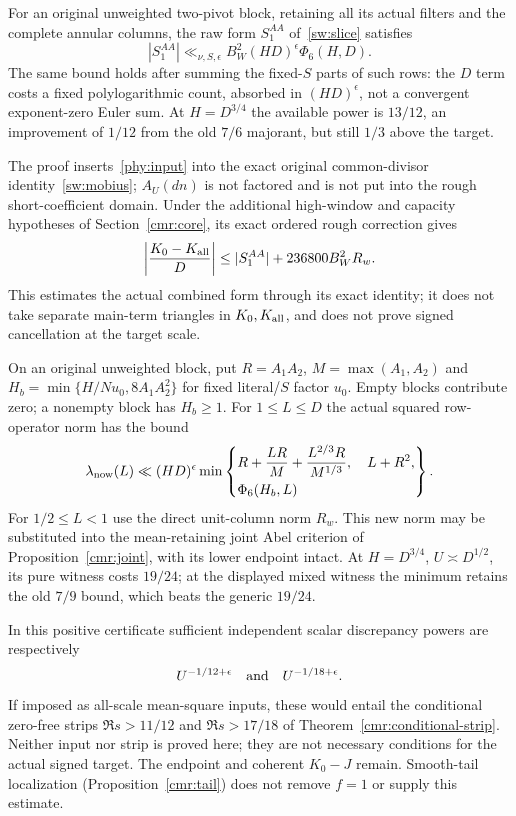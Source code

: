 \begin{proposition}[The actual $A_6=1$ signed slice]\label{phy:signed}
For an original unweighted two-pivot block, retaining all its actual
filters and the complete annular columns, the raw form
$S_1^{AA}$ of~\eqref{sw:slice} satisfies
\[
 |S_1^{AA}|\ll_{\nu,S,\epsilon}
       B_W^2(HD)^\epsilon\Phi_6(H,D).
\]
The same bound holds after summing the fixed-$S$ parts of such rows:
the $D$ term costs a fixed polylogarithmic count, absorbed in
$(HD)^\epsilon$, not a convergent exponent-zero Euler sum.
At $H=D^{3/4}$ the available power is $13/12$, an improvement of $1/12$
from the old $7/6$ majorant, but still $1/3$ above the target.
\end{proposition}
The proof inserts~\eqref{phy:input} into the exact original
common-divisor identity~\eqref{sw:mobius}; $A_U(dn)$ is not factored
and is not put into the rough short-coefficient domain.
Under the additional high-window and capacity hypotheses of
Section~\ref{cmr:core}, its exact ordered rough correction gives
\begin{equation}\label{phy:combined}
 \left|\frac{K_0-K_{\rm all}}D\right|
 \le |S_1^{AA}|+236800B_W^2R_w.
\end{equation}
This estimates the actual combined form through its exact identity;
it does not take separate main-term triangles in $K_0,K_{\rm all}$,
and does not prove signed cancellation at the target scale.

\begin{proposition}\label{phy:short}
On an original unweighted block, put $R=A_1A_2$,
$M=\max(A_1,A_2)$ and
$H_b=\min\{H/Nu_0,8A_1A_2^2\}$ for fixed literal/$S$ factor $u_0$.
Empty blocks contribute zero; a nonempty block has $H_b\ge1$.
For $1\le L\le D$ the actual squared row-operator norm has the bound
\[
 \lambda_{\rm now}(L)\ll(HD)^\epsilon
 \min\left\{\begin{aligned}
 &R+\frac{LR}{M}+\frac{L^{2/3}R}{M^{1/3}},\quad L+R^2,\\
 &\Phi_6(H_b,L)
 \end{aligned}\right\}.
\]
For $1/2\le L<1$ use the direct unit-column norm $R_w$.
This new norm may be substituted into the mean-retaining joint
Abel criterion of Proposition~\ref{cmr:joint}, with its lower endpoint intact.
At $H=D^{3/4}$, $U\asymp D^{1/2}$, its pure witness costs $19/24$;
at the displayed mixed witness the minimum retains the old $7/9$
bound, which beats the generic $19/24$.
\end{proposition}
In this positive certificate sufficient independent scalar discrepancy
powers are respectively
\begin{equation}\label{phy:diagnostic}
 U^{-1/12+\epsilon}\quad\hbox{and}\quad U^{-1/18+\epsilon}.
\end{equation}
If imposed as all-scale mean-square inputs, these would entail the
conditional zero-free strips $\Re s>11/12$ and $\Re s>17/18$ of
Theorem~\ref{cmr:conditional-strip}. Neither input nor strip is proved
here; they are not necessary conditions for the actual signed target.
The endpoint and coherent $K_0-J$ remain. Smooth-tail localization
(Proposition~\ref{cmr:tail}) does not remove $f=1$ or supply this estimate.
